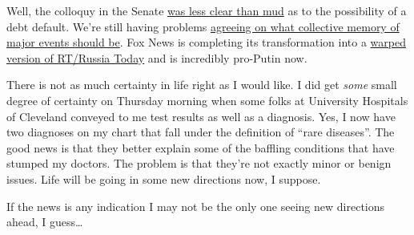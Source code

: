 Well, the colloquy in the Senate
\href{https://archive.org/details/BLOOMBERG_20230307_150000_Bloomberg_Markets_Americas/start/2652.3/end/2780.2}{was
less clear than mud} as to the possibility of a debt default. We're
still having problems
\href{https://archive.org/details/CNNW_20230308_180000_CNN_Newsroom/start/2888.6/end/2958.6}{agreeing
on what collective memory of major events should be}. Fox News is
completing its transformation into a
\href{https://archive.org/details/FOXNEWSW_20230310_010000_Tucker_Carlson_Tonight/start/1499.6/end/1762.2}{warped
version of RT/Russia Today} and is incredibly pro-Putin now.

There is not as much certainty in life right as I would like. I did get
\emph{some} small degree of certainty on Thursday morning when some
folks at University Hospitals of Cleveland conveyed to me test results
as well as a diagnosis. Yes, I now have two diagnoses on my chart that
fall under the definition of ``rare diseases''. The good news is that
they better explain some of the baffling conditions that have stumped my
doctors. The problem is that they're not exactly minor or benign issues.
Life will be going in some new directions now, I suppose.

If the news is any indication I may not be the only one seeing new
directions ahead, I guess\ldots{}

